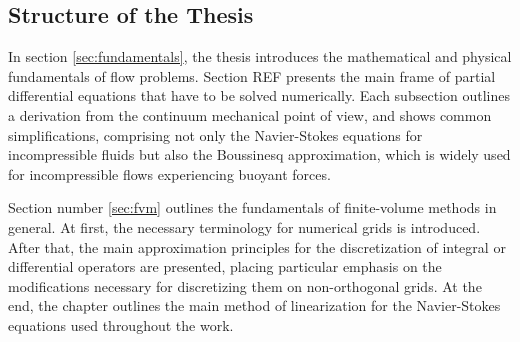 \subsection{Structure of the Thesis}

In section \ref{sec:fundamentals}, the thesis introduces the mathematical and physical fundamentals of flow problems. Section REF presents the main frame of partial differential equations that have to be solved numerically. Each subsection outlines a derivation from the continuum mechanical point of view, and shows common simplifications, comprising not only the Navier-Stokes equations for incompressible fluids but also the Boussinesq approximation, which is widely used for incompressible flows experiencing buoyant forces.

Section number \ref{sec:fvm} outlines the fundamentals of finite-volume methods in general. At first, the necessary terminology for numerical grids is introduced. After that, the main approximation principles for the discretization of integral or differential operators are presented, placing particular emphasis on the modifications necessary for discretizing them on non-orthogonal grids. At the end, the chapter outlines the main method of linearization for the Navier-Stokes equations used throughout the work.

